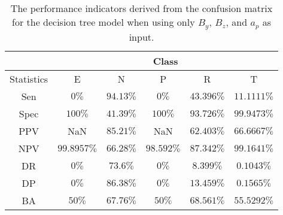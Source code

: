 \begin{table}[!ht]
	\centering
	\begin{tabular}{|c|c|c|c|c|c|}
		\hline
		 & \multicolumn{5}{c|}{Class} \\ \hline
		Statistics & E & N & P & R & T \\ \hline
		Sen & $0\%$ & $94.13\%$ & $0\%$ & $43.396\%$ & $11.1111\%$ \\ \hline
		Spec & $100\%$ & $41.39\%$ & $100\%$ & $93.726\%$ & $99.9473\%$ \\ \hline
		PPV & NaN & $85.21\%$ & NaN & $62.403\%$ & $66.6667\%$ \\ \hline
		NPV & $99.8957\%$ & $66.28\%$ & $98.592\%$ & $87.342\%$ & $99.1641\%$ \\ \hline
		DR & $0\%$ & $73.6\%$ & $0\%$ & $8.399\%$ & $0.1043\%$ \\ \hline
		DP & $0\%$ & $86.38\%$ & $0\%$ & $13.459\%$ & $0.1565\%$ \\ \hline
		BA & $50\%$ & $67.76\%$ & $50\%$ & $68.561\%$ & $55.5292\%$ \\ \hline
	\end{tabular}
	\caption{The performance indicators derived from the confusion matrix for the decision tree model when using only $B_{y}$, $B_{z}$, and $a_{p}$ as input.}
	\label{tab:cs:reverse:yzap:C5.0}
\end{table}

